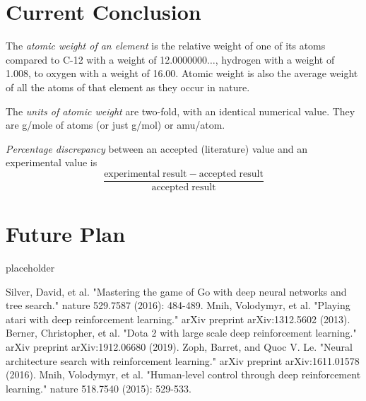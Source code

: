 \documentclass[14pt]{extarticle}
\begin{document}
	

\section{Current Conclusion}

\begin{enumerate}
\begin{item}
The \emph{atomic weight of an element} is the relative weight of one of its atoms compared to C-12 with a weight of 12.0000000$\ldots$, hydrogen with a weight of 1.008, to oxygen with a weight of 16.00. Atomic weight is also the average weight of all the atoms of that element as they occur in nature.
\end{item}
\begin{item}
The \emph{units of atomic weight} are two-fold, with an identical numerical value. They are g/mole of atoms (or just g/mol) or amu/atom.
\end{item}
\begin{item}
\emph{Percentage discrepancy} between an accepted (literature) value and an experimental value is
\begin{equation*}
\frac{\mathrm{experimental\;result} - \mathrm{accepted\;result}}{\mathrm{accepted\;result}}
\end{equation*}
\end{item}
\end{enumerate}


\section{Future Plan}

placeholder




\begin{thebibliography}{99}
	Silver, David, et al. "Mastering the game of Go with deep neural networks and tree search." nature 529.7587 (2016): 484-489.
	Mnih, Volodymyr, et al. "Playing atari with deep reinforcement learning." arXiv preprint arXiv:1312.5602 (2013).
	Berner, Christopher, et al. "Dota 2 with large scale deep reinforcement learning." arXiv preprint arXiv:1912.06680 (2019).
    Zoph, Barret, and Quoc V. Le. "Neural architecture search with reinforcement learning." arXiv preprint arXiv:1611.01578 (2016).
    Mnih, Volodymyr, et al. "Human-level control through deep reinforcement learning." nature 518.7540 (2015): 529-533.
\end{thebibliography}
\end{document}
